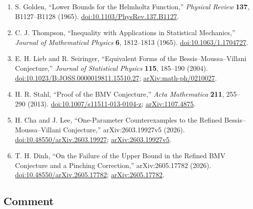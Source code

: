 \begin{enumerate}[label={},leftmargin=4.8em,labelsep=0.5em]
  \footnotesize
  \item[\textup{[Gol65]}]\label{ref:p34-golden}
  S. Golden, ``Lower Bounds for the Helmholtz Function,''
  \emph{Physical Review} \textbf{137}, B1127--B1128 (1965).\newline
  \href{https://doi.org/10.1103/PhysRev.137.B1127}{doi:10.1103/PhysRev.137.B1127}.

  \item[\textup{[Tho65]}]\label{ref:p34-thompson}
  C. J. Thompson, ``Inequality with Applications in Statistical Mechanics,''
  \emph{Journal of Mathematical Physics} \textbf{6}, 1812--1813 (1965).
  \href{https://doi.org/10.1063/1.1704727}{doi:10.1063/1.1704727}.

  \item[\textup{[LS04]}]\label{ref:p34-lieb-seiringer}
  E. H. Lieb and R. Seiringer, ``Equivalent Forms of the
  Bessis--Moussa--Villani Conjecture,'' \emph{Journal of Statistical Physics}
  \textbf{115}, 185--190 (2004).
  \href{https://doi.org/10.1023/B:JOSS.0000019811.15510.27}%
       {doi:10.1023/B:JOSS.0000019811.15510.27};
  \href{https://arxiv.org/abs/math-ph/0210027}{arXiv:math-ph/0210027}.

  \item[\textup{[Sta13]}]\label{ref:p34-stahl}
  H. R. Stahl, ``Proof of the BMV Conjecture,''
  \emph{Acta Mathematica} \textbf{211}, 255--290 (2013).
  \href{https://doi.org/10.1007/s11511-013-0104-z}{doi:10.1007/s11511-013-0104-z};
  \href{https://arxiv.org/abs/1107.4875}{arXiv:1107.4875}.

  \item[\textup{[CL26]}]\label{ref:p34-cha-lee}
  H. Cha and J. Lee, ``One-Parameter Counterexamples to the Refined
  Bessis--Moussa--Villani Conjecture,'' arXiv:2603.19927v5 (2026).
  \href{https://doi.org/10.48550/arXiv.2603.19927}{doi:10.48550/arXiv.2603.19927};
  \href{https://arxiv.org/abs/2603.19927v5}{arXiv:2603.19927v5}.

  \item[\textup{[Din26]}]\label{ref:p34-dinh}
  T. H. Dinh, ``On the Failure of the Upper Bound in the Refined BMV
  Conjecture and a Pinching Correction,'' arXiv:2605.17782 (2026).
  \href{https://doi.org/10.48550/arXiv.2605.17782}{doi:10.48550/arXiv.2605.17782};
  \href{https://arxiv.org/abs/2605.17782}{arXiv:2605.17782}.
\end{enumerate}

\subsection*{Comment}

